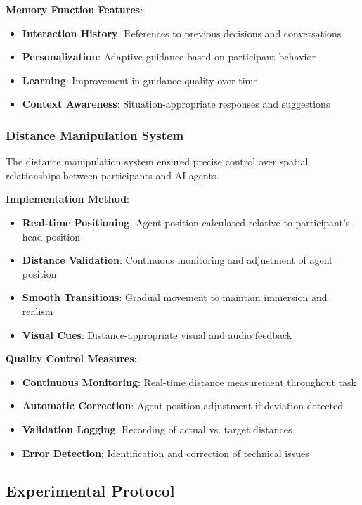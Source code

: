 \documentclass[12pt]{article}
\begin{document}
\textbf{Memory Function Features}:
\begin{itemize}
    \item \textbf{Interaction History}: References to previous decisions and conversations
    \item \textbf{Personalization}: Adaptive guidance based on participant behavior
    \item \textbf{Learning}: Improvement in guidance quality over time
    \item \textbf{Context Awareness}: Situation-appropriate responses and suggestions
\end{itemize}

\subsubsection{Distance Manipulation System}

The distance manipulation system ensured precise control over spatial relationships between participants and AI agents.

\textbf{Implementation Method}:
\begin{itemize}
    \item \textbf{Real-time Positioning}: Agent position calculated relative to participant's head position
    \item \textbf{Distance Validation}: Continuous monitoring and adjustment of agent position
    \item \textbf{Smooth Transitions}: Gradual movement to maintain immersion and realism
    \item \textbf{Visual Cues}: Distance-appropriate visual and audio feedback
\end{itemize}

\textbf{Quality Control Measures}:
\begin{itemize}
    \item \textbf{Continuous Monitoring}: Real-time distance measurement throughout task
    \item \textbf{Automatic Correction}: Agent position adjustment if deviation detected
    \item \textbf{Validation Logging}: Recording of actual vs. target distances
    \item \textbf{Error Detection}: Identification and correction of technical issues
\end{itemize}

\subsection{Experimental Protocol}
\end{document}
